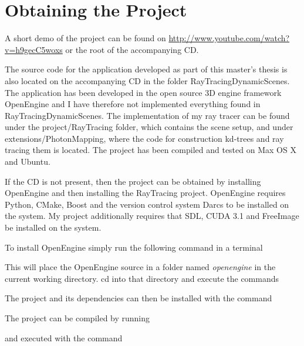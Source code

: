 \chapter{Obtaining the Project}

A short demo of the project can be found on
\url{http://www.youtube.com/watch?v=h9gecC5woxs} or the root of the accompanying
CD.

The source code for the application developed as part of this master's thesis is
also located on the accompanying CD in the folder RayTracingDynamicScenes. The
application has been developed in the open source 3D engine framework OpenEngine
and I have therefore not implemented everything found in
RayTracingDynamicScenes. The implementation of my ray tracer can be found under
the project/RayTracing folder, which contains the scene setup, and under
extensions/PhotonMapping, where the code for construction kd-trees and ray
tracing them is located. The project has been compiled and tested on Max OS X
and Ubuntu.

If the CD is not present, then the project can be obtained by installing
OpenEngine and then installing the RayTracing project. OpenEngine requires
Python, CMake, Boost and the version control system Darcs to be installed on the
system. My project additionally requires that SDL, CUDA 3.1 and FreeImage be
installed on the system.

To install OpenEngine simply run the following command in a terminal


This will place the OpenEngine source in a folder named \textit{openengine} in
the current working directory. cd into that directory and execute the commands



The project and its dependencies can then be installed with the command


The project can be compiled by running


and executed with the command

